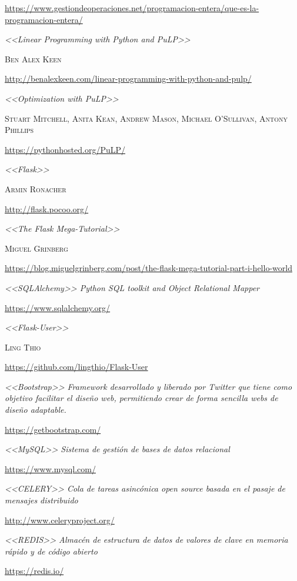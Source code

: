 \documentclass[a4paper]{article}
\begin{document}
\begin{thebibliography}{X}
\url{https://www.gestiondeoperaciones.net/programacion-entera/que-es-la-programacion-entera/}


 \textit{<<Linear Programming with Python and PuLP>>}

\textsc{Ben Alex Keen}

\url{http://benalexkeen.com/linear-programming-with-python-and-pulp/}


 \textit{<<Optimization with PuLP>>}

\textsc{Stuart Mitchell, Anita Kean, Andrew Mason, Michael O’Sullivan, Antony Phillips}

\url{https://pythonhosted.org/PuLP/}


 \textit{<<Flask>>}

\textsc{Armin Ronacher}

\url{http://flask.pocoo.org/}


 \textit{<<The Flask Mega-Tutorial>>}

\textsc{Miguel Grinberg}

\url{https://blog.miguelgrinberg.com/post/the-flask-mega-tutorial-part-i-hello-world}

 \textit{<<SQLAlchemy>> Python SQL toolkit and Object Relational Mapper}

\url{https://www.sqlalchemy.org/}

 \textit{<<Flask-User>>}

\textsc{Ling Thio}

\url{https://github.com/lingthio/Flask-User}


 \textit{<<Bootstrap>> Framework desarrollado y liberado por Twitter que tiene como objetivo facilitar el diseño web, permitiendo crear de forma sencilla webs de diseño adaptable.}

\url{https://getbootstrap.com/}


 \textit{<<MySQL>> Sistema de gestión de bases de datos relacional}

\url{https://www.mysql.com/}


 \textit{<<CELERY>> Cola de tareas asincónica open source basada en el pasaje de mensajes distribuido}

\url{http://www.celeryproject.org/}


 \textit{<<REDIS>> Almacén de estructura de datos de valores de clave en memoria rápido y de código abierto}

\url{https://redis.io/}


\end{thebibliography}
\end{document}
